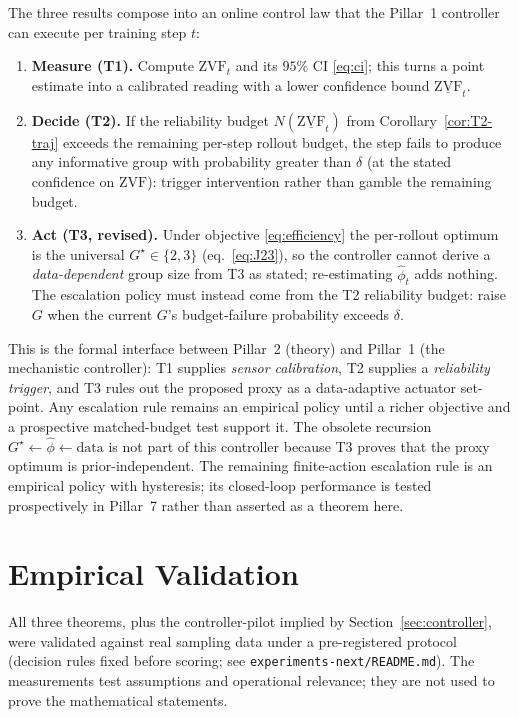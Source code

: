 \documentclass[11pt]{article}
\theoremstyle{plain}
\theoremstyle{definition}
\theoremstyle{remark}
\newcommand{\ZVF}{\ensuremath{\mathrm{ZVF}}}
\newcommand{\1}{\mathbb{1}}
\begin{document}
The three results compose into an online control law that the Pillar~1
controller can execute per training step $t$:
\begin{enumerate}[leftmargin=1.5em,itemsep=2pt]
  \item \textbf{Measure (T1).} Compute $\ZVF_t$ and its $95\%$ CI
        \eqref{eq:ci}; this turns a point estimate into a calibrated reading
        with a lower confidence bound $\underline{\ZVF}_t$.
  \item \textbf{Decide (T2).} If the reliability budget
        $N(\underline{\ZVF}_t)$ from Corollary~\ref{cor:T2-traj} exceeds the
        remaining per-step rollout budget, the step fails to produce any
        informative group with probability greater than $\delta$ (at the
        stated confidence on $\ZVF$): trigger intervention rather than
        gamble the remaining budget.
  \item \textbf{Act (T3, revised).} Under objective \eqref{eq:efficiency}
        the per-rollout optimum is the universal $G^\star\in\{2,3\}$
        (eq.~\ref{eq:J23}), so the controller cannot derive a
        \emph{data-dependent} group size from T3 as stated; re-estimating
        $\widehat\phi_t$ adds nothing. The escalation policy must instead
        come from the T2 reliability budget: raise $G$ when the current
        $G$'s budget-failure probability exceeds $\delta$.
\end{enumerate}
This is the formal interface between Pillar~2 (theory) and Pillar~1 (the
mechanistic controller): T1 supplies \emph{sensor calibration}, T2 supplies a
\emph{reliability trigger}, and T3 rules out the proposed proxy as a
data-adaptive actuator set-point. Any escalation rule remains an empirical
policy until a richer objective and a prospective matched-budget test support it.
The obsolete recursion $G^\star\leftarrow\widehat\phi\leftarrow\mathrm{data}$
is not part of this controller because T3 proves that the proxy optimum is
prior-independent. The remaining finite-action escalation rule is an empirical
policy with hysteresis; its closed-loop performance is tested prospectively in
Pillar~7 rather than asserted as a theorem here.

\section{Empirical Validation}\label{sec:empirical}
All three theorems, plus the controller-pilot implied by
Section~\ref{sec:controller}, were validated against real sampling data
under a pre-registered protocol (decision rules fixed before scoring; see
\texttt{experiments-next/README.md}). The measurements test assumptions and
operational relevance; they are not used to prove the mathematical statements.
\end{document}

